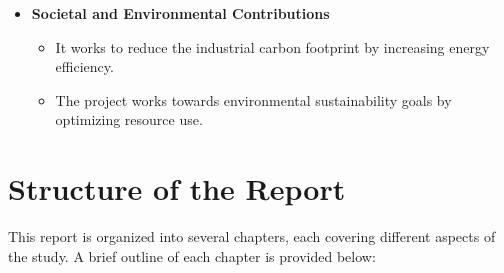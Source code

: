 \begin{itemize}
\begin{itemize}
    \end{itemize}

    \item \textbf{Societal and Environmental Contributions}
    \begin{itemize}
        \item It works to reduce the industrial carbon footprint by increasing energy efficiency.
        \item The project works towards environmental sustainability goals by optimizing resource use.
    \end{itemize}
\end{itemize}


\section{Structure of the Report}

This report is organized into several chapters, each covering different aspects of the study. A brief outline of each chapter is provided below:

